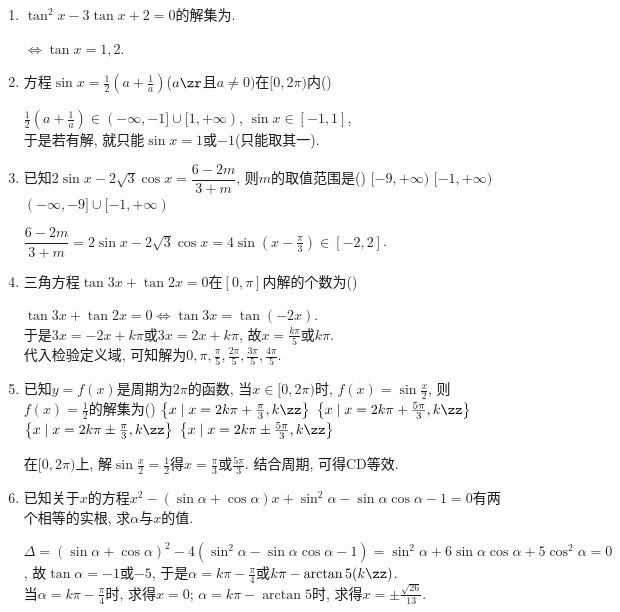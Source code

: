 \begin{enumerate}
\item $\tan^2x-3\tan{x}+2=0$的解集为. 
\begin{jieda}
$\iff\tan{x}=1,2$. 
\end{jieda}

\item 方程$\sin{x}=\frac{1}{2}(a+\frac{1}{a})$($a\zr$且$a\neq0)$在$[0,2\pi)$内\dotfill()
\begin{jieda}
$\frac{1}{2}(a+\frac{1}{a})\in(-\infty,-1]\cup[1,+\infty)$, $\sin{x}\in[-1,1]$, \\
于是若有解, 就只能$\sin{x}=1$或$-1$(只能取其一). 
\end{jieda}

\item 已知$2\sin{x}-2\sqrt{3}\cos{x}=\dfrac{6-2m}{3+m}$, 则$m$的取值范围是\dotfill()
\xx{$[-9,-1]$}
{$[-9,+\infty)$}
{$[-1,+\infty)$}
{$(-\infty,-9]\cup[-1,+\infty)$}
\begin{jieda}
$\dfrac{6-2m}{3+m}=2\sin{x}-2\sqrt{3}\cos{x}=4\sin(x-\frac{\pi}{3})\in[-2,2]$. 
\end{jieda}

\item 三角方程$\tan3x+\tan2x=0$在$[0,\pi]$内解的个数为\dotfill()
\begin{jieda}
$\tan3x+\tan2x=0\iff \tan3x=\tan(-2x)$. \\
于是$3x=-2x+k\pi$或$3x=2x+k\pi$, 故$x=\frac{k\pi}{5}$或$k\pi$. \\
代入检验定义域, 可知解为$0,\pi,\frac{\pi}{5},\frac{2\pi}{5},\frac{3\pi}{5},\frac{4\pi}{5}$. 
\end{jieda}

\item 已知$y=f(x)$是周期为$2\pi$的函数, 当$x\in[0,2\pi)$时, $f(x)=\sin\frac{x}{2}$, 则$f(x)=\frac{1}{2}$的解集为\dotfill()
\xx
{$\left\{x\mid x=2k\pi+\frac{\pi}{3},k\zz\right\}$}
{$\left\{x\mid x=2k\pi+\frac{5\pi}{3},k\zz\right\}$}
{$\left\{x\mid x=2k\pi\pm\frac{\pi}{3},k\zz\right\}$}
{$\left\{x\mid x=2k\pi\pm\frac{5\pi}{3},k\zz\right\}$}
\begin{jieda}
在$[0,2\pi)$上, 解$\sin\frac{x}{2}=\frac{1}{2}$得$x=\frac{\pi}{3}$或$\frac{5\pi}{3}$. 
结合周期, 可得CD等效. 
\end{jieda}

\item 已知关于$x$的方程$x^2-(\sin\alpha+\cos\alpha)x+\sin^2\alpha-\sin\alpha\cos\alpha-1=0$有两个相等的实根, 求$\alpha$与$x$的值. 
\begin{jieda}
$\Delta=(\sin\alpha+\cos\alpha)^2-4(\sin^2\alpha-\sin\alpha\cos\alpha-1)=\sin^2\alpha+6\sin\alpha\cos\alpha+5\cos^2\alpha=0$, 
故$\tan\alpha=-1$或$-5$, 于是$\alpha=k\pi-\frac{\pi}{4}$或$k\pi-\arctan5(k\zz)$. \\
当$\alpha=k\pi-\frac{\pi}{4}$时, 求得$x=0$; $\alpha=k\pi-\arctan5$时, 求得$x=\pm\frac{\sqrt{26}}{13}$. 
\end{jieda}


\end{enumerate}
